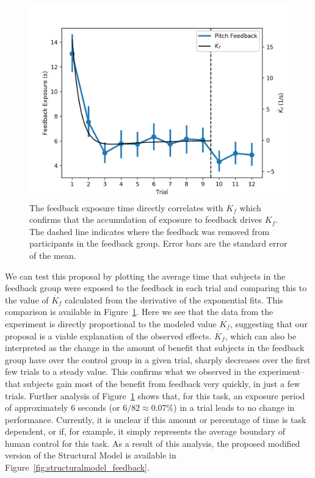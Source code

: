 \begin{figure}[tb]
    \centering
    \includegraphics[width=0.8\linewidth]{figures/Modeling/f_v_kfd.png}
    \caption[The feedback exposure time directly correlates with $\dot{K_{f}}$]{The feedback exposure time directly correlates with $\dot{K_{f}}$ which confirms that the accumulation of exposure to feedback drives $K_f$.
    The dashed line indicates where the feedback was removed from participants in the feedback group.
    Error bars are the standard error of the mean.}
    \label{fig:feedback_kfd}
\end{figure}

We can test this proposal by plotting the average time that subjects in the feedback group were exposed to the feedback in each trial and comparing this to the value of $\dot{K_f}$ calculated from the derivative of the exponential fits.
This comparison is available in Figure~\ref{fig:feedback_kfd}.
Here we see that the data from the experiment is directly proportional to the modeled value $\dot{K_f}$, suggesting that our proposal is a viable explanation of the observed effects.
$\dot{K_f}$, which can also be interpreted as the change in the amount of benefit that subjects in the feedback group have over the control group in a given trial, sharply decreases over the first few trials to a steady value.
This confirms what we observed in the experiment--that subjects gain most of the benefit from feedback very quickly, in just a few trials.
Further analysis of Figure~\ref{fig:feedback_kfd} shows that, for this task, an exposure period of approximately 6 seconds (or $6/82\approx0.07\%$) in a trial leads to no change in performance.
Currently, it is unclear if this amount or percentage of time is task dependent, or if, for example, it simply represents the average boundary of human control for this task.
As a result of this analysis, the proposed modified version of the Structural Model is available in Figure~\ref{fig:structuralmodel_feedback}.

